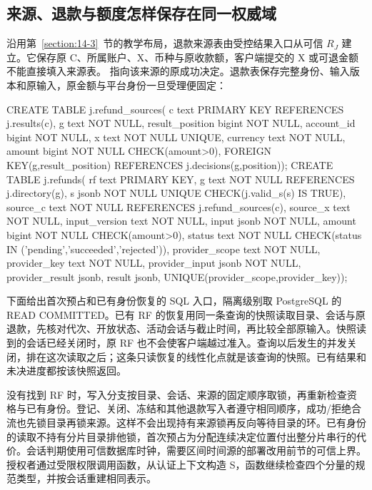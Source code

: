 \subsection*{来源、退款与额度怎样保存在同一权威域}

沿用第~\ref{section:14-3}~节的教学布局，退款来源表由受控结果入口从可信 $R_J$ 建立。它保存原 C、所属账户、X、币种与原收款额，客户端提交的 X 或可退金额不能直接填入来源表。 指向该来源的原成功决定。退款表保存完整身份、输入版本和原输入，原金额与平台身份一旦受理便固定：

\begin{BookCode}
CREATE TABLE j.refund_sources(
 c text PRIMARY KEY REFERENCES j.results(c),
 g text NOT NULL, result_position bigint NOT NULL,
 account_id bigint NOT NULL, x text NOT NULL UNIQUE,
 currency text NOT NULL, amount bigint NOT NULL CHECK(amount>0),
 FOREIGN KEY(g,result_position) REFERENCES j.decisions(g,position));
CREATE TABLE j.refunds(
 rf text PRIMARY KEY, g text NOT NULL REFERENCES j.directory(g),
 s jsonb NOT NULL UNIQUE CHECK(j.valid_s(s) IS TRUE),
 source_c text NOT NULL REFERENCES j.refund_sources(c),
 source_x text NOT NULL, input_version text NOT NULL,
 input jsonb NOT NULL, amount bigint NOT NULL CHECK(amount>0),
 status text NOT NULL CHECK(status IN ('pending','succeeded','rejected')),
 provider_scope text NOT NULL, provider_key text NOT NULL,
 provider_input jsonb NOT NULL,
 provider_result jsonb, result jsonb,
 UNIQUE(provider_scope,provider_key));
\end{BookCode}

下面给出首次预占和已有身份恢复的 SQL 入口，隔离级别取 PostgreSQL 的 READ COMMITTED。已有 RF 的恢复用同一条查询的快照读取目录、会话与原退款，先核对代次、开放状态、活动会话与截止时间，再比较全部原输入。快照读到的会话已经关闭时，原 RF 也不会使客户端越过准入。查询以后发生的并发关闭，排在这次读取之后；这条只读恢复的线性化点就是该查询的快照。已有结果和未决进度都按该快照返回。

没有找到 RF 时，写入分支按目录、会话、来源的固定顺序取锁，再重新检查资格与已有身份。登记、关闭、冻结和其他退款写入者遵守相同顺序，成功/拒绝合流也先锁目录再锁来源。这样不会出现持有来源锁再反向等待目录的环。已有身份的读取不持有分片目录排他锁，首次预占为分配连续决定位置付出整分片串行的代价。会话判期使用可信数据库时钟，需要区间时间源的部署改用前节的可信上界。授权者通过受限权限调用函数，从认证上下文构造 S，函数继续检查四个分量的规范类型，并按会话重建相同表示。

